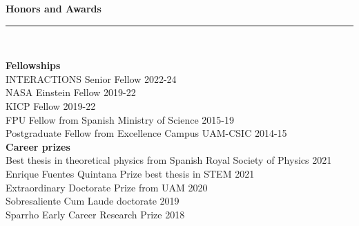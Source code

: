\documentclass[11pt,a4paper]{article}
\newcommand{\secsizesmall}{0.05\linewidth}
\newcommand{\contsizelong}{0.95\linewidth}
\newcommand{\sectionsep}{12pt}
\begin{document}
\vspace{\sectionsep}
\textbf{Honors and Awards} \vspace{-8pt}\\ {\rule{\linewidth}{0.6pt}}\vspace{5pt}\\
\begin{minipage}[t]{\secsizesmall}
\begin{flushleft}
\end{flushleft}
\end{minipage}
\begin{minipage}[t]{\contsizelong}
\begin{flushleft}
\textbf{Fellowships} \\
{INTERACTIONS Senior Fellow} \hfill 2022-24 \\
{NASA Einstein Fellow} \hfill 2019-22 \\
{KICP Fellow} \hfill 2019-22 \\
{FPU Fellow} from Spanish Ministry of Science \hfill 2015-19 \\
{Postgraduate Fellow} from Excellence Campus UAM-CSIC  \hfill 2014-15 \\
\vspace{5pt}
\textbf{Career prizes} \\
{Best thesis in theoretical physics} from Spanish Royal Society of Physics  \hfill 2021 \\
{Enrique Fuentes Quintana Prize} best thesis in STEM  \hfill 2021 \\
{Extraordinary Doctorate Prize} from UAM  \hfill 2020 \\
{Sobresaliente Cum Laude} doctorate \hfill 2019 \\
{Sparrho Early Career Research Prize} \hfill 2018 \\
\end{flushleft}
\end{minipage}
\begin{minipage}[t]{\secsizesmall}
\begin{flushleft}
\end{flushleft}
\end{minipage}
\end{document}
